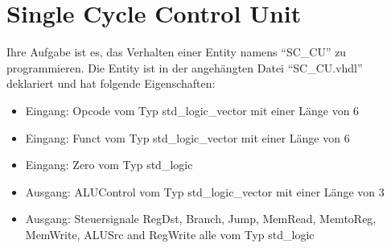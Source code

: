 \documentclass[a4paper,12pt]{article}
\begin{document}
\pagestyle{empty}
\setlength{\parindent}{0em}
\section*{Single Cycle Control Unit}

Ihre Aufgabe ist es, das Verhalten einer Entity  namens "`SC\_CU"' zu programmieren. Die Entity ist in der angeh\"angten Datei "`SC\_CU.vhdl"' deklariert und hat folgende Eigenschaften:
\begin{itemize}
\item Eingang:  Opcode vom Typ std\_logic\_vector mit einer L\"ange von 6
\item Eingang:  Funct vom Typ std\_logic\_vector mit einer L\"ange von 6
\item Eingang:  Zero vom Typ std\_logic
\item Ausgang: ALUControl vom Typ std\_logic\_vector mit einer L\"ange von 3
\item Ausgang: Steuersignale RegDst, Branch, Jump, MemRead, MemtoReg, MemWrite, ALUSrc and RegWrite alle vom Typ std\_logic
\end{itemize}
\end{document}
